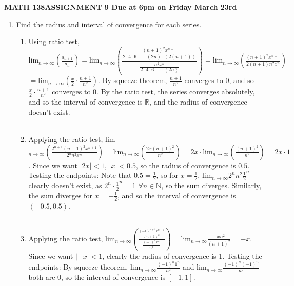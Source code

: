 \documentclass[12pt]{article}
\begin{document}
\noindent
{\bf MATH 138\hfill ASSIGNMENT 9  \hfill Due at 6pm on Friday March 23rd}\\
\begin{enumerate}

\item Find the radius and interval of convergence for each series.

\begin{enumerate}
\item Using ratio test, $\text{lim}_{n\rightarrow\infty}(\frac{a_{n+1}}{a_n}) = \text{lim}_{n\rightarrow\infty}\left(\dfrac{\frac{(n+1)^2x^{n+1}}{2\cdot 4\cdot 6\cdot \cdots \cdot (2n)\cdot (2(n+1))}}{\frac{n^2x^n}{2\cdot 4\cdot 6\cdot \cdots \cdot (2n)}}\right) = \text{lim}_{n\rightarrow\infty}\left(\frac{(n+1)^2x^{n+1}}{2(n+1)n^2x^n}\right)$ \\ $ = \text{lim}_{n\rightarrow\infty}\left(\frac{x}{2}\cdot\frac{n+1}{n^2}\right)$. By squeeze theorem, $\frac{n+1}{n^2}$ converges to 0, and so $\frac{x}{2}\cdot\frac{n+1}{n^2}$ converges to 0. By the ratio test, the series converges absolutely, and so the interval of convergence is $\mathbb{R}$, and the radius of convergence doesn't exist. \\
\\
\item Applying the ratio test, lim$_{n\rightarrow\infty}\left(\frac{2^{n+1}(n+1)^2x^{n+1}}{2^n n^2 x^n}\right) = \text{lim}_{n\rightarrow\infty}\left(\frac{2x(n+1)^2}{n^2}\right) = 2x \cdot \text{lim}_{n\rightarrow\infty}\left(\frac{(n+1)^2}{n^2}\right) = 2x \cdot 1$. Since we want $|2x| < 1$, $|x|<0.5$, so the radius of convergence is $0.5$. Testing the endpoints: Note that $0.5 = \frac{1}{2}$, so for $x = \frac{1}{2}$, $\text{lim}_{n\rightarrow\infty}2^nn^2\frac{1}{2}^n$ clearly doesn't exist, as $2^n \cdot \frac{1}{2}^n = 1$ $\forall n\in\mathbb{N}$, so the sum diverges. Similarly, the sum diverges for $x = -\frac{1}{2}$, and so the interval of convergence is $(-0.5, 0.5)$.\\
\\
\item Applying the ratio test, lim$_{n\rightarrow\infty} \left(\frac{\frac{(-1)^{n+1}x^{n+1}}{(n+1)^2}}{\frac{(-1)^nx^n}{n^2}}\right) = \text{lim}_{n\rightarrow\infty}\frac{-xn^2}{(n+1)^2} = -x$. Since we want $|-x|<1$, clearly the radius of convergence is 1. Testing the endpoints: By squeeze theorem, $\text{lim}_{n\rightarrow\infty}\frac{(-1)^n1^n}{n^2}$ and $\text{lim}_{n\rightarrow\infty}\frac{(-1)^n(-1)^n}{n^2}$ both are 0, so the interval of convergence is $[-1, 1]$.\\

\end{enumerate}
\end{enumerate}
\end{document}
